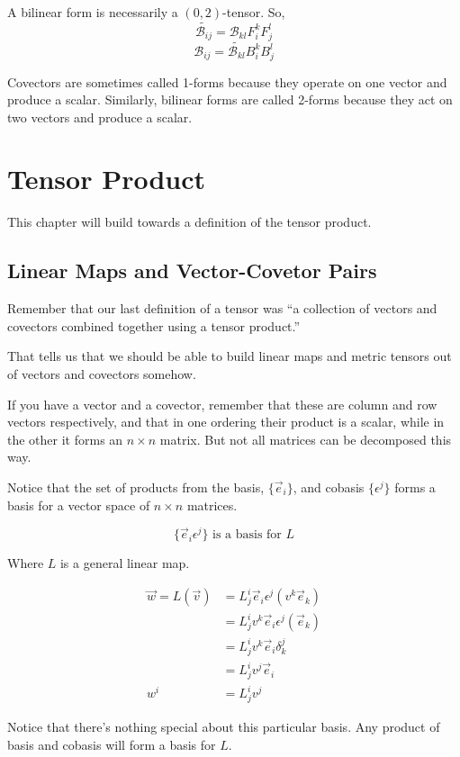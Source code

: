 \documentclass[12pt]{book}
\theoremstyle{plain}
\theoremstyle{definition}
\theoremstyle{ppart}
\theoremstyle{case}
\theoremstyle{solution}
\begin{document}
A bilinear form is necessarily a $(0,2)$-tensor. So,
\[ \widetilde{\mathcal{B}_{ij}} = \mathcal{B}_{kl} F^k_i F^l_j \]
\[ \mathcal{B}_{ij} = \widetilde{\mathcal{B}_{kl}} B^k_i B^l_j \]


Covectors are sometimes called 1-forms because they operate on one vector and produce a scalar. Similarly,
bilinear forms are called 2-forms because they act on two vectors and produce a scalar.

\chapter{Tensor Product}

This chapter will build towards a definition of the tensor product.

\section{Linear Maps and Vector-Covetor Pairs}

Remember that our last definition of a tensor was ``a collection of vectors and covectors combined together
using a tensor product.'' \cite{youtube:tensor10}

That tells us that we should be able to build linear maps and metric tensors out of vectors and covectors
somehow.

If you have a vector and a covector, remember that these are column and row vectors respectively,
and that in one ordering their product is a scalar, while in the other it forms an $n \times n$ matrix.
But not all matrices can be decomposed this way.

Notice that the set of products from the basis, $\{\vec{e}_i\}$, and cobasis $\{\epsilon^j\}$ forms a basis for a vector space of $n \times n$ matrices.

\[ \{ \vec{e}_i \epsilon^j \} \text{ is a basis for } L \]

Where $L$ is a general linear map.

\begin{align*}
  \vec{w} = L(\vec{v})
  &= L^i_j \vec{e}_i \epsilon^j (v^k \vec{e}_k) \\
  &= L^i_j v^k \vec{e}_i \epsilon^j (\vec{e}_k) \\
  &= L^i_j v^k \vec{e}_i \delta^j_k \\
  &= L^i_j v^j \vec{e}_i \\
  w^i &= L^i_j v^j
\end{align*}

Notice that there's nothing special about this particular basis. Any product of basis and cobasis will form a basis for $L$. 
\end{document}
